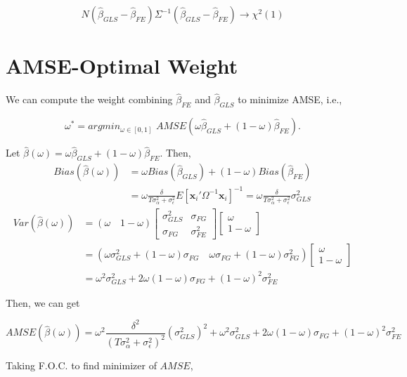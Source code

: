 \documentclass[11pt]{article}
\begin{document}
\[
N(\widehat{\beta}_{GLS}-\widehat{\beta}_{FE}) \Sigma^{-1} (\widehat{\beta}_{GLS} - \widehat{\beta}_{FE}) \rightarrow \chi^2(1)
\]


\section*{AMSE-Optimal Weight}

We can compute the weight combining $\widehat{\beta}_{FE}$ and $\widehat{\beta}_{GLS}$ to minimize AMSE, i.e.,

\[
\omega^{*} = argmin_{\omega\in [0,1]} \,\, AMSE(\omega\widehat{\beta}_{GLS} + (1-\omega) \widehat{\beta}_{FE}). 
\]

Let $\widehat{\beta}(\omega) = \omega\widehat{\beta}_{GLS} + (1-\omega)\widehat{\beta}_{FE}$. Then,
\begin{align*}
Bias(\widehat{\beta}(\omega)) &= \omega Bias(\widehat{\beta}_{GLS}) + (1-\omega) Bias(\widehat{\beta}_{FE})\\
&= \omega \frac{\delta}{T\sigma_\alpha^2 + \sigma_\epsilon^2} E[\mathbf{x}_i' \Omega^{-1} \mathbf{x}_i]^{-1} = \omega\frac{\delta}{T\sigma_\alpha^2 + \sigma_\epsilon^2} \sigma_{GLS}^2
\end{align*}
\begin{align*}
Var(\widehat{\beta}(\omega)) &= (\omega\quad 1-\omega) \begin{bmatrix}
\sigma_{GLS}^2 & \sigma_{FG}\\
\sigma_{FG} & \sigma_{FE}^2
\end{bmatrix} \begin{bmatrix}
\omega\\
1-\omega
\end{bmatrix} \\
&= ( \omega \sigma_{GLS}^2 + (1-\omega)\sigma_{FG} \quad \omega\sigma_{FG} + (1-\omega)\sigma_{FG}^2) \begin{bmatrix}
\omega\\
1-\omega
\end{bmatrix} \\
&= \omega^2 \sigma_{GLS}^2 + 2\omega(1-\omega) \sigma_{FG} + (1-\omega)^2 \sigma_{FE}^2
\end{align*}
 
Then, we can get 

\[
AMSE(\widehat{\beta}(\omega)) = \omega^2 \frac{\delta^2}{(T\sigma_\alpha^2 + \sigma_\epsilon^2)^2} (\sigma_{GLS}^2)^2 + \omega^2 \sigma_{GLS}^2 + 2\omega(1-\omega) \sigma_{FG} + (1-\omega)^2 \sigma_{FE}^2
\] 

Taking F.O.C. to find minimizer of $AMSE$, 
\end{document}
